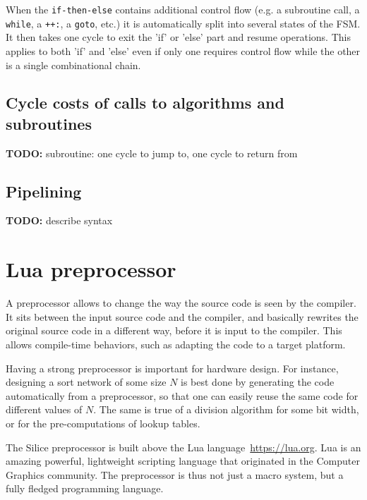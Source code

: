\documentclass[a4]{article}
\newcommand\todo[1]{{\color{magenta}\textbf{TODO:} #1}}
\newcommand\silice{Silice}
\begin{document}
When the \texttt{if-then-else} contains additional control flow (e.g. a subroutine call, a \texttt{while}, a \texttt{++:}, a \texttt{goto}, etc.) it is automatically split into several states of the FSM. It then takes one cycle to exit the 'if' or 'else' part and resume operations. This applies to both 'if' and 'else' even if only one requires control flow while the other is a single combinational chain.


\subsection{Cycle costs of calls to algorithms and subroutines}

\todo{subroutine: one cycle to jump to, one cycle to return from}


\subsection{Pipelining}

\todo{describe syntax \ttfamily{\{ \} -> \{ \}}}


\section{Lua preprocessor}

A preprocessor allows to change the way the source code is seen by the compiler.
It sits between the input source code and the compiler, and basically rewrites the
original source code in a different way, before it is input to the compiler.
This allows compile-time behaviors, such as adapting the code to a target platform.

Having a strong preprocessor is important for hardware design. For instance,
designing a sort network of some size $N$ is best done by generating the code 
automatically from a preprocessor, so that one can easily reuse the
same code for different values of $N$. The same is true of a division 
algorithm for some bit width, or for the pre-computations of lookup tables.

The \silice{} preprocessor is built above the Lua language~\url{https://lua.org}. Lua is an amazing powerful, lightweight scripting language that originated in the Computer Graphics community. The preprocessor is thus not just a macro system, but a fully fledged programming language.
\end{document}

